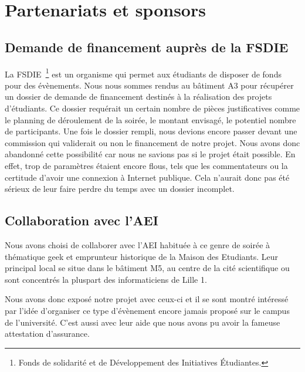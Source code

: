 \section{Partenariats et sponsors}%
\label{sec:partenariats_et_sponsors}

\subsection{Demande de financement auprès de la FSDIE}%
\label{sub:demande_de_financement_aupr_s_de_la_fsdie}

La FSDIE\, \footnote{Fonds de solidarité et de Développement des
Initiatives Étudiantes.} est un organisme qui permet aux étudiants de
disposer de fonds pour des évènements.
Nous nous sommes rendus au bâtiment A3 pour récupérer un
dossier de demande de financement destinés à la réalisation des projets d'étudiants.
Ce dossier requérait un certain nombre de pièces justificatives comme le
planning de déroulement de la soirée, le montant envisagé, le potentiel
nombre de participants. Une fois le dossier rempli, nous devions encore passer devant
une commission qui validerait ou non le financement de notre projet. Nous avons donc
abandonné cette possibilité car nous ne savions pas si le projet était
possible. En effet, trop de paramètres étaient encore flous, tels que les commentateurs
ou la certitude d'avoir une connexion à Internet publique. Cela n'aurait donc pas été
sérieux de leur faire perdre du temps avec un dossier incomplet.

\subsection{Collaboration avec l'AEI}%
\label{sub:collaboration_avec_l_aei}

Nous avons choisi de collaborer avec l'AEI habituée à ce genre de soirée
à thématique \og geek \fg{} et
emprunteur historique de la Maison des Etudiants.
Leur principal local se situe dans le bâtiment M5, au centre de la
cité scientifique ou sont concentrés la pluspart des informaticiens de
Lille 1.

Nous avons donc exposé notre projet avec ceux-ci et il se sont montré
intéressé par l'idée d'organiser ce type d'évènement encore jamais
proposé sur le campus de l'université. C'est aussi avec leur aide que
nous avons pu avoir la fameuse attestation d'assurance.

